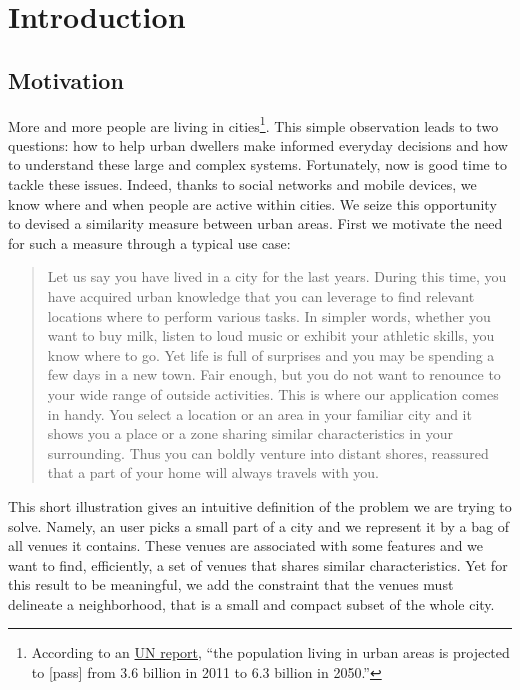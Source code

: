\chapter{Introduction}
\label{ch:introduction}

\section{Motivation}

More and more people are living in cities\footnote{According to an
\href{http://esa.un.org/unup/pdf/WUP2011_Highlights.pdf}{UN report},
\enquote{the population living in urban areas is projected to [pass] from 3.6
billion in 2011 to 6.3 billion in 2050.}}. This simple observation leads to
two questions: how to help urban dwellers make informed everyday decisions and
how to understand these large and complex systems. Fortunately, now is good
time to tackle these issues. Indeed, thanks to social networks and mobile
devices, we know where and when people are active within
cities\autocite{SpatialComputing12}. We seize this opportunity to devised a
similarity measure between urban areas. First we motivate the need for such a
measure through a typical use case:

\begin{quote}
Let us say you have lived in a city for the last years. During this time,
you have acquired urban knowledge that you can leverage to find relevant
locations where to perform various tasks. In simpler words, whether you want
to buy milk, listen to loud music or exhibit your athletic skills, you know
where to go. Yet life is full of surprises and you may be spending a few
days in a new town. Fair enough, but you do not want to renounce to your
wide range of outside activities. This is where our application comes in
handy. You select a location or an area in your familiar city and it shows
you a place or a zone sharing similar characteristics in your surrounding.
Thus you can boldly venture into distant shores, reassured that a part of
your home will always travels with you.
\end{quote}

This short illustration gives an intuitive definition of the problem we are
trying to solve. Namely, an user picks a small part of a city and we represent
it by a bag of all venues it contains. These venues are associated with some
features and we want to find, efficiently, a set of venues that shares similar
characteristics. Yet for this result to be meaningful, we add the constraint
that the venues must delineate a neighborhood, that is a small and compact
subset of the whole city.

